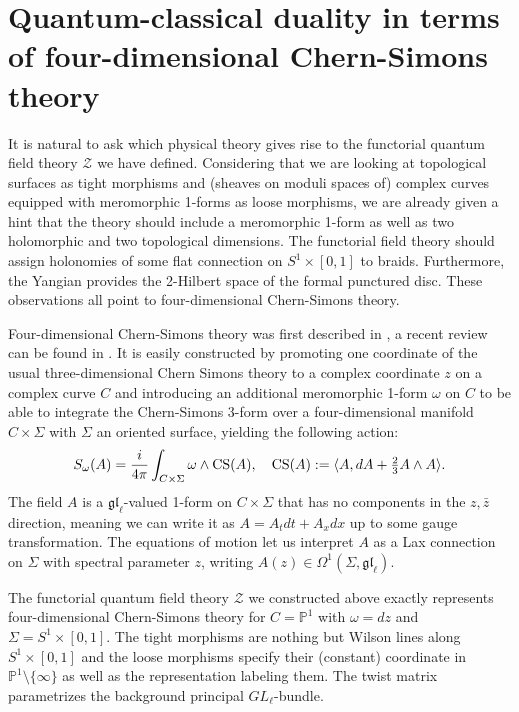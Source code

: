 \documentclass[11pt]{report}
\theoremstyle{definition}
\theoremstyle{remark}
\theoremstyle{remark}
\renewcommand{\P}{\mathbb{P}}
\begin{document}
\section{Quantum-classical duality in terms of four-dimensional Chern-Simons theory}

It is natural to ask which physical theory gives rise to the functorial quantum field theory $\mathcal{Z}$ we have defined. Considering that we are looking at topological surfaces as tight morphisms and (sheaves on moduli spaces of) complex curves equipped with meromorphic 1-forms as loose morphisms, we are already given a hint that the theory should include a meromorphic 1-form as well as two holomorphic and two topological dimensions. The functorial field theory should assign holonomies of some flat connection on $S^1 \times [0,1]$ to braids. Furthermore, the Yangian provides the 2-Hilbert space of the formal punctured disc. These observations all point to four-dimensional Chern-Simons theory.

Four-dimensional Chern-Simons theory was first described in \cite{article:costello:2013}, a recent review can be found in \cite{article:lacroix:2022}. It is easily constructed by promoting one coordinate of the usual three-dimensional Chern Simons theory to a complex coordinate $z$ on a complex curve $C$ and introducing an additional meromorphic 1-form $\omega$ on $C$ to be able to integrate the Chern-Simons 3-form over a four-dimensional manifold $C \times \Sigma$ with $\Sigma$ an oriented surface, yielding the following action:
\begin{equation*}
S_\omega(A) = \frac{i}{4\pi} \int_{C \times \Sigma} \omega \wedge \textnormal{CS}(A), \quad \textnormal{CS}(A) := \langle A, dA + \tfrac 23 A \wedge A \rangle.
\end{equation*}
The field $A$ is a $\mathfrak{gl}_\ell$-valued 1-form on $C \times \Sigma$ that has no components in the $z,\bar z$ direction, meaning we can write it as $A = A_t dt + A_x dx$ up to some gauge transformation. The equations of motion let us interpret $A$ as a Lax connection on $\Sigma$ with spectral parameter $z$, writing $A(z) \in \Omega^1(\Sigma,\mathfrak{gl}_\ell)$.

The functorial quantum field theory $\mathcal{Z}$ we constructed above exactly represents four-dimen\-sional Chern-Simons theory for $C=\P^1$ with $\omega = dz$ and $\Sigma = S^1 \times [0,1]$. The tight morphisms are nothing but Wilson lines along $S^1 \times [0,1]$ and the loose morphisms specify their (constant) coordinate in $\P^1 \setminus \{ \infty \}$ as well as the representation labeling them. The twist matrix parametrizes the background principal $GL_\ell$-bundle.
\end{document}
